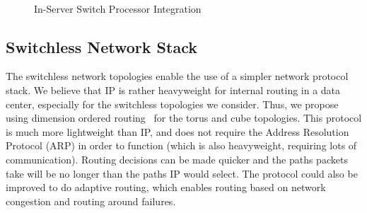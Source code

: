 \begin{figure}
    \centering
    ~
    \vspace{-0.07in}
    \caption{In-Server Switch Processor Integration}
    \label{fig:in_server_switch_design}
\end{figure}

\vspace{-0.1in}
\subsection{Switchless Network Stack}
\label{sec:arch:sec:net_stack}

The switchless network topologies enable the use of a simpler network protocol stack.  We believe that IP is rather heavyweight for internal routing in a data center, especially for the switchless topologies we consider.  Thus, we propose using dimension ordered routing~\cite{Ni:1993:SWRTDN} for the torus and cube topologies. This protocol is much more lightweight than IP, and does not require the Address Resolution Protocol (ARP) in order to function (which is also heavyweight, requiring lots of communication).  Routing decisions can be made quicker and the paths packets take will be no longer than the paths IP would select.  The protocol could also be improved to do adaptive routing, which enables routing based on network congestion and routing around failures.



